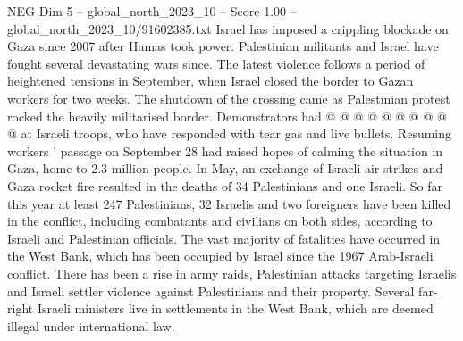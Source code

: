 \begin{textsample}{NEG Dim 5 – global\_north\_2023\_10 – Score 1.00 – global\_north\_2023\_10/91602385.txt}
Israel has imposed a crippling blockade on Gaza since 2007 after Hamas took power.
Palestinian militants and Israel have fought several devastating wars since.
The latest violence follows a period of heightened tensions in September, when Israel closed the border to Gazan workers for two weeks.
The shutdown of the crossing came as Palestinian protest rocked the heavily militarised border.
Demonstrators had @ @ @ @ @ @ @ @ @ @ at Israeli troops, who have responded with tear gas and live bullets.
Resuming workers ' passage on September 28 had raised hopes of calming the situation in Gaza, home to 2.3 million people.
In May, an exchange of Israeli air strikes and Gaza rocket fire resulted in the deaths of 34 Palestinians and one Israeli.
So far this year at least 247 Palestinians, 32 Israelis and two foreigners have been killed in the conflict, including combatants and civilians on both sides, according to Israeli and Palestinian officials.
The vast majority of fatalities have occurred in the West Bank, which has been occupied by Israel since the 1967 Arab-Israeli conflict.
There has been a rise in army raids, Palestinian attacks targeting Israelis and Israeli settler violence against Palestinians and their property.
Several far-right Israeli ministers live in settlements in the West Bank, which are deemed illegal under international law.

\end{textsample}
